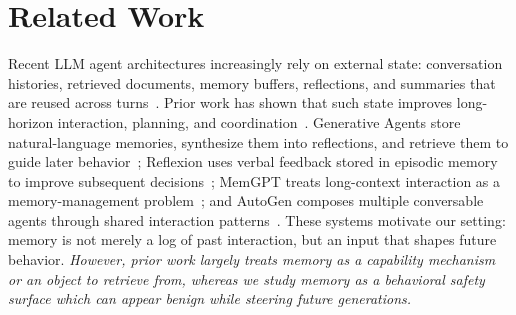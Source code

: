 
\vspace{-6pt}
\section{Related Work}
\label{sec:related}

 Recent LLM agent architectures increasingly rely on external state: conversation histories, retrieved documents, memory buffers, reflections, and summaries that are reused across turns~\citep{ai2025memorybench,wang2025recursively}. Prior work has shown that such state improves long-horizon interaction, planning, and coordination~\citep{xi2025agentgym}. Generative Agents store natural-language memories, synthesize them into reflections, and retrieve them to guide later behavior~\citep{park2023generative}; Reflexion uses verbal feedback stored in episodic memory to improve subsequent decisions~\citep{shinn2023reflexion}; MemGPT treats long-context interaction as a memory-management problem~\citep{packer2023memgpt}; and AutoGen composes multiple conversable agents through shared interaction patterns~\citep{wu2024autogen}. These systems motivate our setting: memory is not merely a log of past interaction, but an input that shapes future behavior. \textit{However, prior work largely treats memory as a capability mechanism or an object to retrieve from, whereas we study memory as a behavioral safety surface which can appear benign while steering future generations.}

